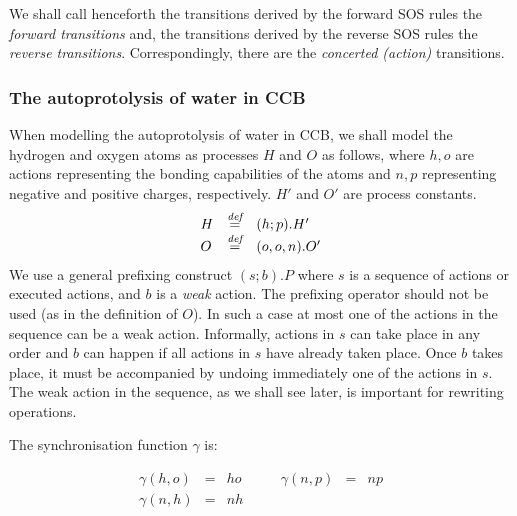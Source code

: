 \documentclass[runningheads]{llncs}
\newcommand{\bydef}{\stackrel{\emph{def}}{=}}
\begin{document}
We shall call henceforth the transitions derived by the forward SOS rules the \emph{forward transitions} 
and, the transitions derived by the reverse SOS rules the \emph{reverse transitions}.
Correspondingly, there are the \emph{concerted (action)} transitions. 

\subsubsection{The autoprotolysis of water in CCB}

When modelling the autoprotolysis of water in CCB, we shall model the hydrogen and oxygen atoms as processes $H$ and $O$ as follows, where 
$h,o$ are actions representing the bonding capabilities of the atoms and $n,p$ 
representing negative and positive charges, respectively. $H'$ and $O'$ are process constants.
$$\begin{array}{lll}
H & \bydef & (h;p).H'\\
O & \bydef & (o,o,n).O'
\end{array}$$
We use a general prefixing construct $(s;b).P$ where $s$ is a sequence of actions or executed 
actions, and $b$ is a \emph{weak} action. The prefixing operator should not be used (as in the definition of $O$). In such a case at most one of the actions in the sequence can be a weak action. Informally, actions in $s$ can take place in any order 
and $b$ can happen if
all actions in $s$ have already taken place. Once $b$ takes place, it must be accompanied by
undoing immediately one of the actions in $s$. The weak action in the sequence, as we shall see later, is important for rewriting operations.  

The synchronisation function $\gamma$ is:

$$\begin{array}{llllll}
\gamma(h,o) & = & ho \qquad &
\gamma(n,p) & = & np\\
\gamma(n,h) & = & nh &
\end{array}$$
\end{document}
